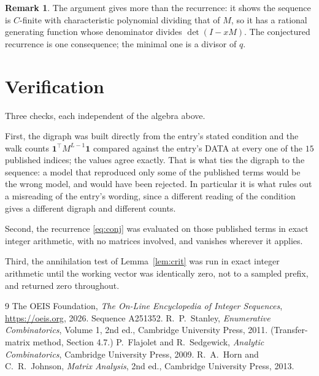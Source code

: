 \documentclass[11pt,a4paper]{article}
\theoremstyle{plain}
\theoremstyle{definition}
\newtheorem{remark}[theorem]{Remark}
\begin{document}
\begin{remark}
The argument gives more than the recurrence: it shows the sequence is $C$-finite with
characteristic polynomial dividing that of $M$, so it has a rational generating function
whose denominator divides $\det(I-xM)$. The conjectured recurrence is one consequence; the
minimal one is a divisor of $q$.
\end{remark}

\section{Verification}

Three checks, each independent of the algebra above.

First, the digraph was built directly from the entry's stated condition and the walk counts
$\mathbf{1}^{\!\top}M^{L-1}\mathbf{1}$ compared against the entry's DATA at
every one of the $15$ published indices; the values agree exactly. That is what ties
the digraph to the sequence: a model that reproduced only some of the published terms would
be the wrong model, and would have been rejected. In particular it is what rules out a
misreading of the entry's wording, since a different reading of the condition gives a
different digraph and different counts.

Second, the recurrence \eqref{eq:conj} was evaluated on those published terms in exact
integer arithmetic, with no matrices involved, and vanishes wherever it applies.

Third, the annihilation test of Lemma~\ref{lem:crit} was run in exact integer arithmetic
until the working vector was identically zero, not to a sampled prefix, and returned zero
throughout.

\begin{thebibliography}{9}
 The OEIS Foundation, \emph{The On-Line Encyclopedia of Integer
Sequences}, \url{https://oeis.org}, 2026. Sequence A251352.
 R.~P.~Stanley, \emph{Enumerative Combinatorics}, Volume 1, 2nd ed.,
Cambridge University Press, 2011. (Transfer-matrix method, Section 4.7.)
 P.~Flajolet and R.~Sedgewick, \emph{Analytic Combinatorics}, Cambridge
University Press, 2009.
 R.~A.~Horn and C.~R.~Johnson, \emph{Matrix Analysis}, 2nd ed., Cambridge
University Press, 2013.
\end{thebibliography}
\end{document}
